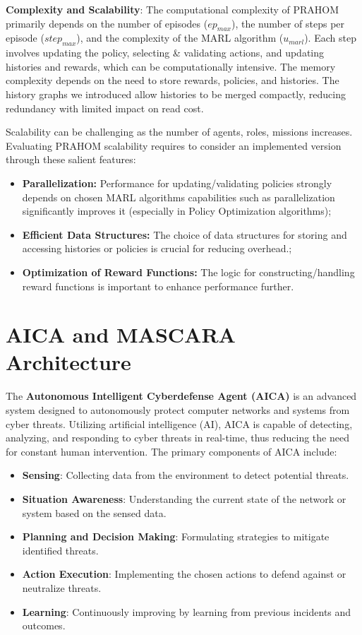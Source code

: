 \documentclass[conference]{IEEEtran}
\begin{document}
\textbf{Complexity and Scalability}: \quad The computational complexity of PRAHOM primarily depends on the number of episodes ($ep_{max}$), the number of steps per episode ($step_{max}$), and the complexity of the MARL algorithm ($u_{marl}$). Each step involves updating the policy, selecting \& validating actions, and updating histories and rewards, which can be computationally intensive. The memory complexity depends on the need to store rewards, policies, and histories. The history graphs we introduced allow histories to be merged compactly, reducing redundancy with limited impact on read cost.

Scalability can be challenging as the number of agents, roles, missions increases. Evaluating PRAHOM scalability requires to consider an implemented version through these salient features:
\begin{itemize}
    \item \textbf{Parallelization:} Performance for updating/validating policies strongly depends on chosen MARL algorithms capabilities such as parallelization significantly improves it (especially in Policy Optimization algorithms);
    \item \textbf{Efficient Data Structures:} The choice of data structures for storing and accessing histories or policies is crucial for reducing overhead.;
    \item \textbf{Optimization of Reward Functions:} The logic for constructing/handling reward functions is important to enhance performance further.
\end{itemize}

\section{AICA and MASCARA Architecture}

The \textbf{Autonomous Intelligent Cyberdefense Agent (AICA)} is an advanced system designed to autonomously protect computer networks and systems from cyber threats. Utilizing artificial intelligence (AI), AICA is capable of detecting, analyzing, and responding to cyber threats in real-time, thus reducing the need for constant human intervention. The primary components of AICA include:

\begin{itemize}
    \item \textbf{Sensing}: Collecting data from the environment to detect potential threats.
    \item \textbf{Situation Awareness}: Understanding the current state of the network or system based on the sensed data.
    \item \textbf{Planning and Decision Making}: Formulating strategies to mitigate identified threats.
    \item \textbf{Action Execution}: Implementing the chosen actions to defend against or neutralize threats.
    \item \textbf{Learning}: Continuously improving by learning from previous incidents and outcomes.
\end{itemize}
\end{document}
